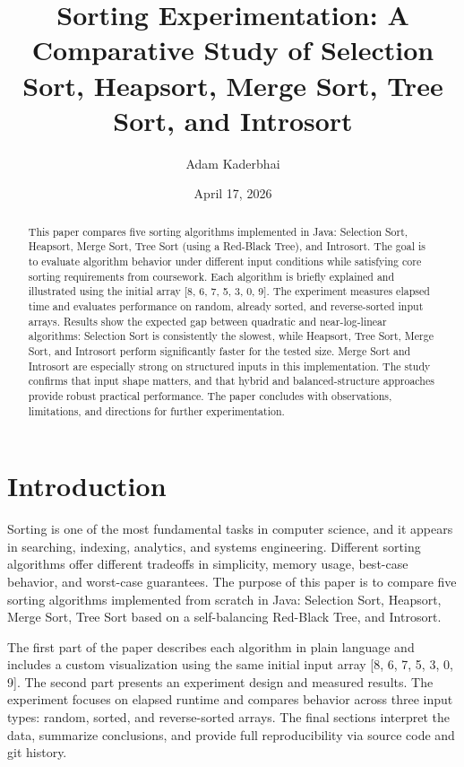 \documentclass[12pt]{article}
\title{Sorting Experimentation: A Comparative Study of Selection Sort, Heapsort, Merge Sort, Tree Sort, and Introsort}
\author{Adam Kaderbhai}
\date{April 17, 2026}
\begin{document}
\maketitle

\begin{abstract}
This paper compares five sorting algorithms implemented in Java: Selection Sort, Heapsort, Merge Sort, Tree Sort (using a Red-Black Tree), and Introsort. The goal is to evaluate algorithm behavior under different input conditions while satisfying core sorting requirements from coursework. Each algorithm is briefly explained and illustrated using the initial array [8, 6, 7, 5, 3, 0, 9]. The experiment measures elapsed time and evaluates performance on random, already sorted, and reverse-sorted input arrays. Results show the expected gap between quadratic and near-log-linear algorithms: Selection Sort is consistently the slowest, while Heapsort, Tree Sort, Merge Sort, and Introsort perform significantly faster for the tested size. Merge Sort and Introsort are especially strong on structured inputs in this implementation. The study confirms that input shape matters, and that hybrid and balanced-structure approaches provide robust practical performance. The paper concludes with observations, limitations, and directions for further experimentation.
\end{abstract}

\section{Introduction}
Sorting is one of the most fundamental tasks in computer science, and it appears in searching, indexing, analytics, and systems engineering. Different sorting algorithms offer different tradeoffs in simplicity, memory usage, best-case behavior, and worst-case guarantees. The purpose of this paper is to compare five sorting algorithms implemented from scratch in Java: Selection Sort, Heapsort, Merge Sort, Tree Sort based on a self-balancing Red-Black Tree, and Introsort.

The first part of the paper describes each algorithm in plain language and includes a custom visualization using the same initial input array [8, 6, 7, 5, 3, 0, 9]. The second part presents an experiment design and measured results. The experiment focuses on elapsed runtime and compares behavior across three input types: random, sorted, and reverse-sorted arrays. The final sections interpret the data, summarize conclusions, and provide full reproducibility via source code and git history.
\end{document}
